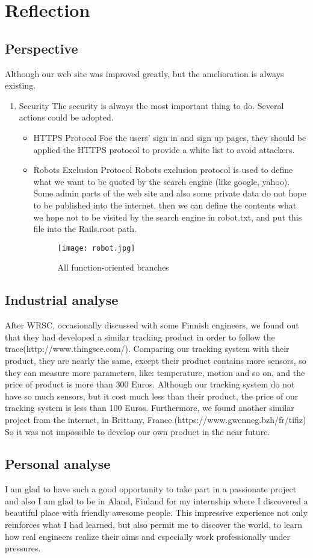\section{Reflection}
\subsection{Perspective}
Although our web site was improved greatly, but the amelioration is always existing.
\begin{enumerate}
\item{Security}
The security is always the most important thing to do. Several actions could be adopted.
\begin{itemize}
\item{HTTPS Protocol}
Foe the users' sign in and sign up pages, they should be applied the HTTPS protocol to provide a white list to avoid attackers.
\item{Robots Exclusion Protocol}
Robots exclusion protocol is used to define what we want to be quoted by the search engine (like google, yahoo). Some admin parts of the web site and also some private data do not hope to be published into the internet, then we can define the contents what we hope not to be visited by the search engine in robot.txt, and put this file into the Rails.root path. 
\begin{figure}[h!]
    \centering
    \texttt{[image: robot.jpg]}
    \caption{All function-oriented branches }
    \label{fig-sample}
\end{figure} 
\end{itemize} 
\end{enumerate}
\subsection{Industrial analyse}
After WRSC, occasionally discussed with some Finnish engineers, we found out that they had developed a similar tracking product in order to follow the trace(http://www.thingsee.com/). Comparing our tracking system with their product, they are nearly the same, except their product contains more sensors, so they can measure more parameters, like: temperature, motion and so on, and the price of product is more than 300 Euros. Although our tracking system do not have so much sensors, but it cost much less than their product, the price of our tracking system is less than 100 Euros.
Furthermore, we found another similar project from the internet, in Brittany, France.(https://www.gwenneg.bzh/fr/tifiz) So it was not impossible to develop our own product in the near future.
\subsection{Personal analyse}
I am glad to have such a good opportunity to take part in a passionate project and also I am glad to be in Aland, Finland for my internship where I discovered a beautiful place with friendly awesome people. This impressive experience not only reinforces what I had learned, but also permit me to discover the world, to learn how real engineers realize their aims and especially work professionally under pressures.